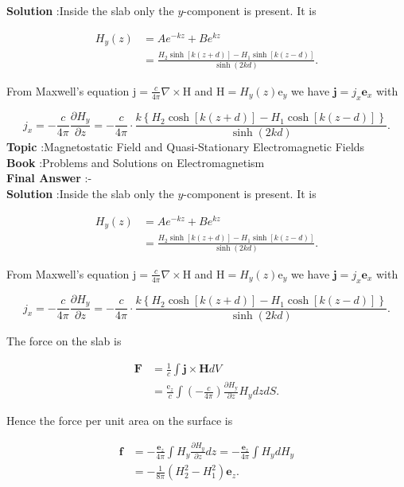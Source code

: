 \documentclass[10pt]{article}
\begin{document}
\textbf{Solution} :Inside the slab only the $y$-component is present. It is

$$
\begin{aligned}
H_{y}(z) &=A e^{-k z}+B e^{k z} \\
&=\frac{H_{2} \sinh [k(z+d)]-H_{1} \sinh [k(z-d)]}{\sinh (2 k d)} .
\end{aligned}
$$

 From Maxwell's equation $\mathrm{j}=\frac{c}{4 \pi} \nabla \times \mathrm{H}$ and $\mathrm{H}=H_{y}(z) \mathrm{e}_{y}$ we have $\mathbf{j}=j_{x} \mathbf{e}_{x}$ with

$$
j_{x}=-\frac{c}{4 \pi} \frac{\partial H_{y}}{\partial z}=-\frac{c}{4 \pi} \cdot \frac{k\left\{H_{2} \cosh [k(z+d)]-H_{1} \cosh [k(z-d)]\right\}}{\sinh (2 k d)} .
$$
\textbf{Topic} :Magnetostatic Field and Quasi-Stationary Electromagnetic Fields\\
\textbf{Book} :Problems and Solutions on Electromagnetism\\
\textbf{Final Answer} :- \cdot {}\\


\textbf{Solution} :Inside the slab only the $y$-component is present. It is

$$
\begin{aligned}
H_{y}(z) &=A e^{-k z}+B e^{k z} \\
&=\frac{H_{2} \sinh [k(z+d)]-H_{1} \sinh [k(z-d)]}{\sinh (2 k d)} .
\end{aligned}
$$

 From Maxwell's equation $\mathrm{j}=\frac{c}{4 \pi} \nabla \times \mathrm{H}$ and $\mathrm{H}=H_{y}(z) \mathrm{e}_{y}$ we have $\mathbf{j}=j_{x} \mathbf{e}_{x}$ with

$$
j_{x}=-\frac{c}{4 \pi} \frac{\partial H_{y}}{\partial z}=-\frac{c}{4 \pi} \cdot \frac{k\left\{H_{2} \cosh [k(z+d)]-H_{1} \cosh [k(z-d)]\right\}}{\sinh (2 k d)} .
$$

 The force on the slab is

$$
\begin{aligned}
\mathbf{F} &=\frac{1}{c} \int \mathbf{j} \times \mathbf{H} d V \\
&=\frac{\mathrm{e}_{z}}{c} \int\left(-\frac{c}{4 \pi}\right) \frac{\partial H_{\mathrm{y}}}{\partial z} H_{y} d z d S .
\end{aligned}
$$

Hence the force per unit area on the surface is

$$
\begin{aligned}
\mathbf{f} &=-\frac{\mathbf{e}_{z}}{4 \pi} \int H_{y} \frac{\partial H_{y}}{\partial z} d z=-\frac{\mathbf{e}_{z}}{4 \pi} \int H_{y} d H_{y} \\
&=-\frac{1}{8 \pi}\left(H_{2}^{2}-H_{1}^{2}\right) \mathbf{e}_{z} .
\end{aligned}
$$
\end{document}
